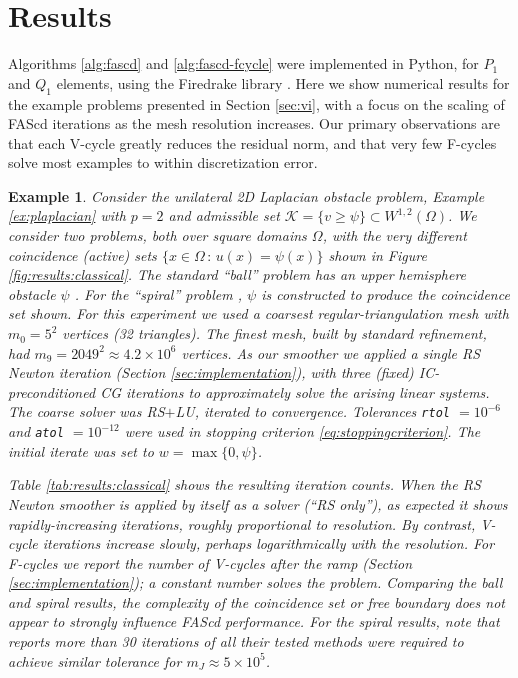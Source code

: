 \documentclass[letterpaper,final,12pt,reqno]{amsart}
\theoremstyle{cstyle}
\theoremstyle{cstyle*}
\theoremstyle{dstyle}
\newtheorem{example}[theorem]{Example}
\numberwithin{equation}{section}
\numberwithin{figure}{section}
\numberwithin{table}{section}
\numberwithin{theorem}{section}
\begin{document}
\section{Results} \label{sec:results}

Algorithms \ref{alg:fascd} and \ref{alg:fascd-fcycle} were implemented in Python, for $P_1$ and $Q_1$ elements, using the Firedrake library \cite{Rathgeberetal2016}.  Here we show numerical results for the example problems presented in Section \ref{sec:vi}, with a focus on the scaling of FAScd iterations as the mesh resolution increases.  Our primary observations are that each V-cycle greatly reduces the residual norm, and that very few F-cycles solve most examples to within discretization error.

\begin{example} \label{ex:results:classical}
Consider the unilateral 2D Laplacian obstacle problem, Example \ref{ex:plaplacian} with $p=2$ and admissible set $\mathcal{K} = \{v \ge \psi\} \subset W^{1,2}(\Omega)$.  We consider two problems, both over square domains $\Omega$, with the very different coincidence (active) sets $\{x\in\Omega \,:\, u(x)=\psi(x)\}$ shown in Figure \ref{fig:results:classical}.  The standard ``ball'' problem has an upper hemisphere obstacle $\psi$ \cite[Chapter 12]{Bueler2021}.  For the ``spiral'' problem \cite[problem 7.1.1]{GraeserKornhuber2009}, $\psi$ is constructed to produce the coincidence set shown.  For this experiment we used a coarsest regular-triangulation mesh with $m_0=5^2$ vertices (32 triangles).  The finest mesh, built by standard refinement, had $m_9=2049^2 \approx 4.2 \times 10^{6}$ vertices.  As our smoother we applied a single RS Newton iteration (Section \ref{sec:implementation}), with three (fixed) IC-preconditioned CG iterations to approximately solve the arising linear systems.  The coarse solver was RS$+$LU, iterated to convergence.  Tolerances \texttt{rtol} $= 10^{-6}$ and \texttt{atol} $= 10^{-12}$ were used in stopping criterion \eqref{eq:stoppingcriterion}.  The initial iterate was set to $w=\max\{0,\psi\}$.

Table \ref{tab:results:classical} shows the resulting iteration counts.  When the RS Newton smoother is applied by itself as a solver (``RS only''), as expected it shows rapidly-increasing iterations, roughly proportional to resolution.  By contrast, V-cycle iterations increase slowly, perhaps logarithmically with the resolution.  For F-cycles we report the number of V-cycles after the ramp (Section \ref{sec:implementation}); a constant number solves the problem.  Comparing the ball and spiral results, the complexity of the coincidence set or free boundary does not appear to strongly influence FAScd performance.  For the spiral results, note that \cite{GraeserKornhuber2009} reports more than 30 iterations of all their tested methods were required to achieve similar tolerance for $m_J \approx 5\times 10^5$.


\end{example}
\end{document}
